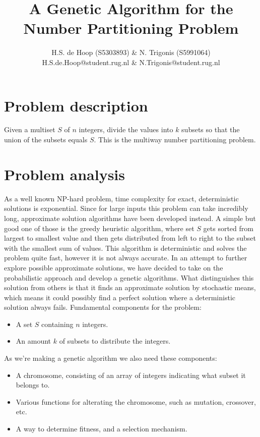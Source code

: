 \documentclass[a4paper,10pt]{article}
\title{A Genetic Algorithm for the Number Partitioning Problem}
\author{H.S. de Hoop (S5303893) \& N. Trigonis (S5991064)\\
        H.S.de.Hoop@student.rug.nl \& N.Trigonis@student.rug.nl}
\begin{document}
\maketitle

\section{Problem description}
Given a multiset $S$ of $n$ integers, divide the values into $k$ subsets so that the union of the subsets equals $S$.
This is the multiway number partitioning problem.
\section{Problem analysis}


As a well known NP-hard problem, time complexity for exact, deterministic solutions is exponential.
Since for large inputs this problem can take incredibly long, approximate solution algorithms have been developed instead.
A simple but good one of those is the greedy heuristic algorithm, where set $S$ gets sorted from largest to smallest value and then gets distributed from left to right to the subset with the smallest sum of values.
This algorithm is deterministic and solves the problem quite fast, however it is not always accurate.
In an attempt to further explore possible approximate solutions, we have decided to take on the probabilistic approach and develop a genetic algorithms.
What distinguishes this solution from others is that it finds an approximate solution by stochastic means, which means it could possibly find a perfect solution where a deterministic solution always fails.
\newline
\newline
Fundamental components for the problem:
\begin{itemize}
  \item A set $S$ containing $n$ integers.
  \item An amount $k$ of subsets to distribute the integers.
\end{itemize}
As we're making a genetic algorithm we also need these components:
\begin{itemize}
  \item A chromosome, consisting of an array of integers indicating what subset it belongs to.
  \item Various functions for alterating the chromosome, such as mutation, crossover, etc.
  \item A way to determine fitness, and a selection mechanism.
\end{itemize}
\end{document}
